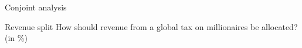 \documentclass[aspectratio=169,xcolor=dvipsnames, 11pt,mathserif]{beamer}
\begin{document}
\begin{frame}{Conjoint analysis}
\begin{figure}
\begin{subfigure}{.50\textwidth}
\end{subfigure}
\end{figure}
\end{frame}

\begin{frame}{Revenue split}
\centering How should revenue from a global tax on millionaires be allocated? (in \%) \quad {}
\end{frame}
\end{document}
